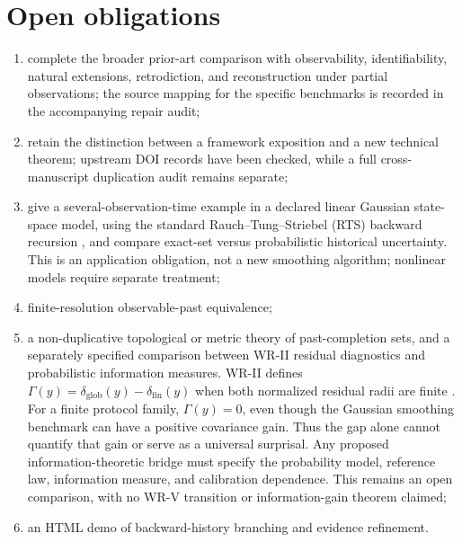 \documentclass[11pt]{article}
\begin{document}
\section{Open obligations}
\begin{enumerate}
\item complete the broader prior-art comparison with observability,
identifiability, natural extensions, retrodiction, and reconstruction
under partial observations; the source mapping for the specific
benchmarks is recorded in the accompanying repair audit;
\item retain the distinction between a framework exposition and a new
technical theorem; upstream DOI records have been checked, while a full
cross-manuscript duplication audit remains separate;
\item give a several-observation-time example in a declared linear
Gaussian state-space model, using the standard Rauch--Tung--Striebel
(RTS) backward recursion \cite[Section 3.2]{RauchTungStriebel1965}
\cite[Section 12.2, Theorem 12.2]{SarkkaSvensson2023}, and compare
exact-set versus probabilistic historical uncertainty. This is an
application obligation, not a new smoothing algorithm; nonlinear
models require separate treatment;
\item finite-resolution observable-past equivalence;
\item a non-duplicative topological or metric theory of past-completion
sets, and a separately specified comparison between WR-II residual
diagnostics and probabilistic information measures. WR-II defines
$\Gamma(y)=\delta_{\mathrm{glob}}(y)-\delta_{\mathrm{fin}}(y)$ when
both normalized residual radii are finite \cite[Section 10]{WRII}.
For a finite protocol family, $\Gamma(y)=0$, even though the Gaussian
smoothing benchmark can have a positive covariance gain. Thus the
gap alone cannot quantify that gain or serve as a universal
surprisal. Any proposed information-theoretic bridge must specify
the probability model, reference law, information measure, and
calibration dependence. This remains an open comparison, with no
WR-V transition or information-gain theorem claimed;
\item an HTML demo of backward-history branching and evidence refinement.
\end{enumerate}
\end{document}
